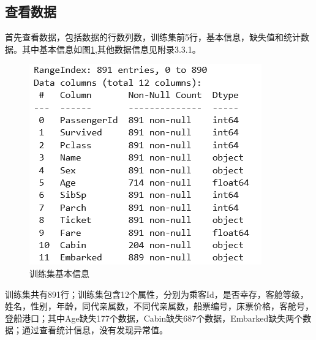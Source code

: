 \subsection{查看数据}
首先查看数据，包括数据的行数列数，训练集前5行，基本信息，缺失值和统计数据。其中基本信息如图\ref{4},其他数据信息见附录3.3.1。
	\begin{figure}[H]
		\centering
		\includegraphics[scale=0.8,angle=0]{images/4.png}
		\caption{训练集基本信息}
		\label{4}
	\end{figure}
训练集共有891行；训练集包含12个属性，分别为乘客Id，是否幸存，客舱等级，姓名，性别，年龄，同代亲属数，不同代亲属数，船票编号，床票价格，客舱号，登船港口；其中Age缺失177个数据，Cabin缺失687个数据，Embarked缺失两个数据；通过查看统计信息，没有发现异常值。
